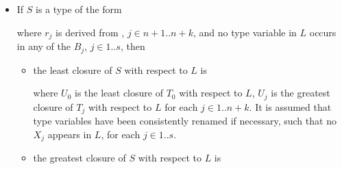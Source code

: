 \documentclass[makeidx]{article}
\begin{document}
{\begin{itemize}
  \noindent

  \noindent
  and no type variable in $L$ occurs in any of the $B_j$, $j \in 1 .. s$,
  then
  \begin{itemize}
  \item
    the least closure of $S$ with respect to $L$ is

    \noindent

    \noindent
    where
    $U_0$ is the least closure of $T_0$ with respect to $L$,
    $U_j$ is the greatest closure of $T_j$ with respect to $L$
    for each $j \in 1 .. n + k$.
    It is assumed that type variables have been consistently renamed
    if necessary,
    such that no $X_j$ appears in $L$,
    for each $j \in 1 .. s$.
  \item
    the greatest closure of $S$ with respect to $L$ is

    \noindent

    \noindent
    where $U_0$ is the greatest closure of $T_0$ with respect to $L$,
    $U_j$ is the least closure of $T_j$ with respect to $L$
    for each $j \in 1 .. n + k$.
    It is assumed that type variables have been consistently renamed
    if necessary,
    such that no $X_j$ appears in $L$,
    for each $j \in 1 .. s$.
  \end{itemize}
\item
  If $S$ is a type of the form

  \noindent

  \noindent
  where $r_j$ is derived from , $j \in n + 1 .. n + k$,
  and no type variable in $L$ occurs in any of the $B_j$, $j \in 1 .. s$,
  then
  \begin{itemize}
  \item
    the least closure of $S$ with respect to $L$ is

    \noindent

    \noindent
    where
    $U_0$ is the least closure of $T_0$ with respect to $L$,
    $U_j$ is the greatest closure of $T_j$ with respect to $L$
    for each $j \in 1 .. n + k$.
    It is assumed that type variables have been consistently renamed
    if necessary,
    such that no $X_j$ appears in $L$,
    for each $j \in 1 .. s$.
  \item
    the greatest closure of $S$ with respect to $L$ is


\end{itemize}
\end{itemize}}
\end{document}

